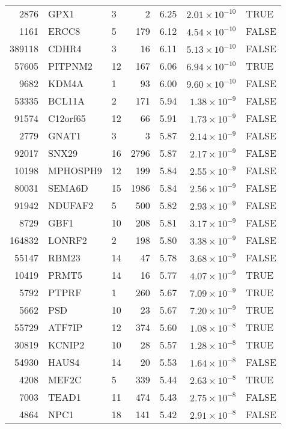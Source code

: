\begin{table}[ht]
\begin{adjustbox}{totalheight=10in}
\begin{tabular}{rllrrrl}
  2876 & GPX1 & 3 &   2 & 6.25 & $2.01 \times 10^{-10}$ & TRUE \\ 
  1161 & ERCC8 & 5 & 179 & 6.12 & $4.54 \times 10^{-10}$ & FALSE \\ 
  389118 & CDHR4 & 3 &  16 & 6.11 & $5.13 \times 10^{-10}$ & FALSE \\ 
  57605 & PITPNM2 & 12 & 167 & 6.06 & $6.94 \times 10^{-10}$ & TRUE \\ 
  9682 & KDM4A & 1 &  93 & 6.00 & $9.60 \times 10^{-10}$ & FALSE \\ 
  53335 & BCL11A & 2 & 171 & 5.94 & $1.38 \times 10^{-9}$ & FALSE \\ 
  91574 & C12orf65 & 12 &  66 & 5.91 & $1.73 \times 10^{-9}$ & FALSE \\ 
  2779 & GNAT1 & 3 &   3 & 5.87 & $2.14 \times 10^{-9}$ & FALSE \\ 
  92017 & SNX29 & 16 & 2796 & 5.87 & $2.17 \times 10^{-9}$ & FALSE \\ 
  10198 & MPHOSPH9 & 12 & 199 & 5.84 & $2.55 \times 10^{-9}$ & FALSE \\ 
  80031 & SEMA6D & 15 & 1986 & 5.84 & $2.56 \times 10^{-9}$ & FALSE \\ 
  91942 & NDUFAF2 & 5 & 500 & 5.82 & $2.93 \times 10^{-9}$ & FALSE \\ 
  8729 & GBF1 & 10 & 208 & 5.81 & $3.17 \times 10^{-9}$ & FALSE \\ 
  164832 & LONRF2 & 2 & 198 & 5.80 & $3.38 \times 10^{-9}$ & FALSE \\ 
  55147 & RBM23 & 14 &  47 & 5.78 & $3.68 \times 10^{-9}$ & FALSE \\ 
  10419 & PRMT5 & 14 &  16 & 5.77 & $4.07 \times 10^{-9}$ & TRUE \\ 
  5792 & PTPRF & 1 & 260 & 5.67 & $7.09 \times 10^{-9}$ & TRUE \\ 
  5662 & PSD & 10 &  23 & 5.67 & $7.20 \times 10^{-9}$ & TRUE \\ 
  55729 & ATF7IP & 12 & 374 & 5.60 & $1.08 \times 10^{-8}$ & TRUE \\ 
  30819 & KCNIP2 & 10 &  28 & 5.57 & $1.28 \times 10^{-8}$ & TRUE \\ 
  54930 & HAUS4 & 14 &  20 & 5.53 & $1.64 \times 10^{-8}$ & FALSE \\ 
  4208 & MEF2C & 5 & 339 & 5.44 & $2.63 \times 10^{-8}$ & TRUE \\ 
  7003 & TEAD1 & 11 & 474 & 5.43 & $2.75 \times 10^{-8}$ & FALSE \\ 
  4864 & NPC1 & 18 & 141 & 5.42 & $2.91 \times 10^{-8}$ & FALSE \\ 

\end{tabular}
\end{adjustbox}
\end{table}
